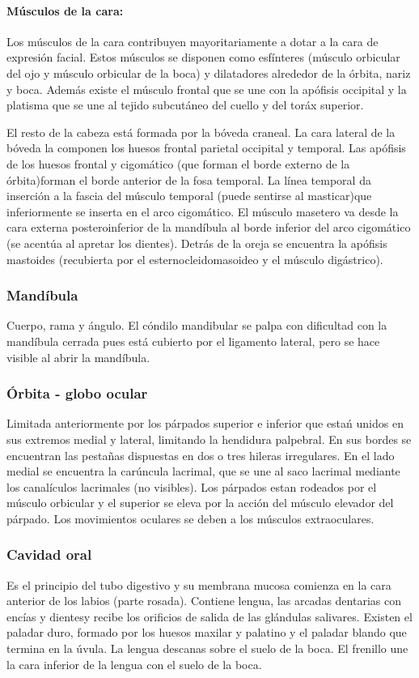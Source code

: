 \documentclass[a4paper,12pt]{article} %
\begin{document}
\begin{appendices}
\paragraph{Músculos de la cara:} Los músculos de la cara contribuyen mayoritariamente a dotar a la cara de expresión facial. Estos músculos se disponen como esfínteres (músculo orbicular del ojo y músculo orbicular de la boca) y dilatadores alrededor de la órbita, nariz y boca. Además existe el músculo frontal que se une con la apófisis occipital y la platisma que se une al tejido subcutáneo del cuello y del toráx superior.

El resto de la cabeza está formada por la bóveda craneal. La cara lateral de la bóveda la componen los huesos frontal parietal occipital y temporal.
Las apófisis de los huesos frontal y cigomático (que forman el borde externo de la órbita)forman el borde anterior de la fosa temporal. La línea temporal da inserción a la fascia del músculo temporal  (puede sentirse al masticar)que inferiormente se inserta en el arco cigomático.
El músculo masetero va desde la cara externa posteroinferior de la mandíbula al borde inferior del arco cigomático (se acentúa al apretar los dientes).
Detrás de la oreja se encuentra la apófisis mastoides (recubierta por el esternocleidomasoideo y el músculo digástrico).

\subsubsection{Mandíbula}
Cuerpo, rama y ángulo. El cóndilo mandibular se palpa con dificultad con la mandíbula cerrada pues está cubierto por el ligamento lateral, pero se hace visible al abrir la mandíbula.

\subsubsection{Órbita - globo ocular}
Limitada anteriormente por los párpados superior e inferior que estań unidos en sus extremos medial y lateral, limitando la hendidura palpebral. En sus bordes se encuentran las pestañas dispuestas en dos o tres hileras irregulares. En el lado medial se encuentra la carúncula lacrimal, que se une al saco lacrimal mediante los canalículos lacrimales (no visibles). Los párpados estan rodeados por el músculo orbicular y el superior se eleva por la acción del músculo elevador del párpado. Los movimientos oculares se deben a los músculos extraoculares.

\subsubsection{Cavidad oral}
Es el principio del tubo digestivo y su membrana mucosa comienza en la cara anterior de los labios (parte rosada). Contiene lengua, las arcadas dentarias con encías y dientesy recibe los orificios de salida de las glándulas salivares. Existen el paladar duro, formado por los huesos maxilar y palatino y el paladar blando que termina en la úvula. La lengua descanas sobre el suelo de la boca. El frenillo une la cara inferior de la lengua con el suelo de la boca.


\end{appendices}
\end{document}
